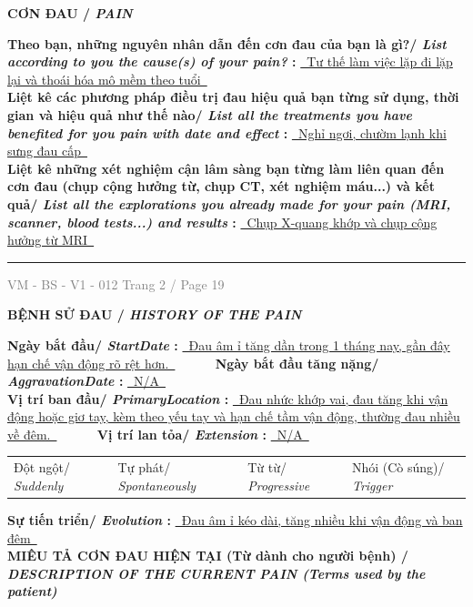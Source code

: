 \documentclass[11pt,a4paper]{article}
\newcommand{\CheckBox}[2][false]{%
    \ifthenelse{\equal{#1}{true}}{%
        \makebox[0pt][l]{$\square$}\raisebox{.15ex}{\hspace{0.08em}$\checkmark$}%
    }{%
        $\square$%
    }%
    \hspace{0.12cm}#2%
}
\newcommand{\SectionTitle}[2]{%
    \vspace{0.12cm}
    {\bfseries\large #1/ \textit{#2}}\par
    \vspace{0.06cm}
}
\newcommand{\SubSectionTitle}[2]{%
    \vspace{0.08cm}
    {\bfseries #1/ \textit{#2}}\par
}
\newcommand{\FormFooter}[2]{%
    \vfill
    \hrule
    \vspace{0.08cm}
    \noindent
    \small \textcolor{gray}{VM - BS - V1 - 012} \hfill \small \textcolor{gray}{Trang #1 / Page #2}
}
\begin{document}
\SubSectionTitle{ CƠN ĐAU }{ PAIN }

\textbf{ Theo bạn, những nguyên nhân dẫn đến cơn đau của bạn là gì?/ \textit{ List according to you the cause(s) of your pain? }: } \underline{~Tư thế làm việc lặp đi lặp lại và thoái hóa mô mềm theo tuổi~}\\[0.12cm]
\textbf{ Liệt kê các phương pháp điều trị đau hiệu quả bạn từng sử dụng, thời gian và hiệu quả như thế nào/ \textit{ List all the treatments you have benefited for you pain with date and effect }: } \underline{~Nghỉ ngơi, chườm lạnh khi sưng đau cấp~}\\[0.12cm]
\textbf{ Liệt kê những xét nghiệm cận lâm sàng bạn từng làm liên quan đến cơn đau (chụp cộng hưởng từ, chụp CT, xét nghiệm máu...) và kết quả/ \textit{ List all the explorations you already made for your pain (MRI, scanner, blood tests...) and results }: } \underline{~Chụp X-quang khớp và chụp cộng hưởng từ MRI~}\\[0.12cm]


\FormFooter{ 2 }{ 19 }
\newpage

\SectionTitle{ BỆNH SỬ ĐAU }{ HISTORY OF THE PAIN }

\textbf{ Ngày bắt đầu/ \textit{ StartDate }: } \underline{~Đau âm ỉ tăng dần trong 1 tháng nay, gần đây hạn chế vận động rõ rệt hơn.~} ~~~~~ \textbf{ Ngày bắt đầu tăng nặng/ \textit{ AggravationDate }: } \underline{~N/A~}\\[0.12cm]
\textbf{ Vị trí ban đầu/ \textit{ PrimaryLocation }: } \underline{~Đau nhức khớp vai, đau tăng khi vận động hoặc giơ tay, kèm theo yếu tay và hạn chế tầm vận động, thường đau nhiều về đêm.~} ~~~~~ \textbf{ Vị trí lan tỏa/ \textit{ Extension }: } \underline{~N/A~}\\[0.12cm]

\begin{tabularx}{\textwidth}{@{} X X X X @{}}
    \CheckBox[false]{ Đột ngột/ \textit{ Suddenly } }  &     \CheckBox[false]{ Tự phát/ \textit{ Spontaneously } }  &     \CheckBox[false]{ Từ từ/ \textit{ Progressive } }  &     \CheckBox[false]{ Nhói (Cò súng)/ \textit{ Trigger } }   \\[0.12cm]
\end{tabularx}
\textbf{ Sự tiến triển/ \textit{ Evolution }: } \underline{~Đau âm ỉ kéo dài, tăng nhiều khi vận động và ban đêm~}\\[0.12cm]

\SubSectionTitle{ MIÊU TẢ CƠN ĐAU HIỆN TẠI (Từ dành cho người bệnh) }{ DESCRIPTION OF THE CURRENT PAIN (Terms used by the patient) }
\end{document}
